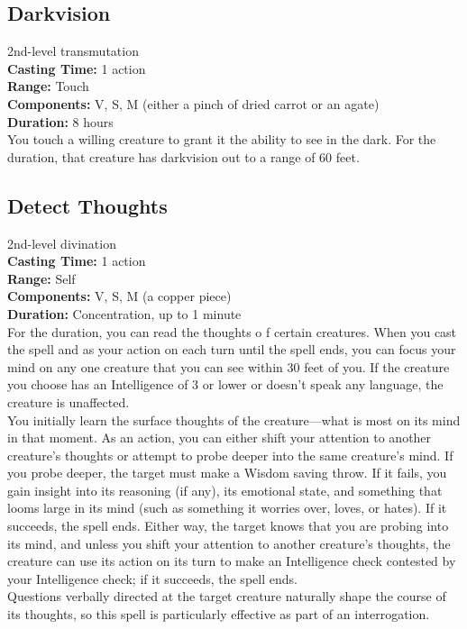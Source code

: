 \documentclass[11pt, A4paper, english]{article}
\begin{document}
		\subsection{Darkvision}
2nd-level transmutation \\
\textbf{Casting Time:} 1 action \\
\textbf{Range:} Touch \\
\textbf{Components:} V, S, M (either a pinch of dried carrot or an agate) \\
\textbf{Duration:} 8 hours \\
You touch a willing creature to grant it the ability to see in the dark. For the duration, that creature has darkvision out to a range of 60 feet.

		\subsection{Detect Thoughts}
2nd-level divination \\
\textbf{Casting Time:} 1 action \\
\textbf{Range:} Self \\
\textbf{Components:} V, S, M (a copper piece) \\
\textbf{Duration:} Concentration, up to 1 minute \\
For the duration, you can read the thoughts o f certain creatures. When you cast the spell and as your action on each turn until the spell ends, you can focus your mind on any one creature that you can see within 30 feet of you. If the creature you choose has an Intelligence of 3 or lower or doesn’t speak any language, the creature is unaffected. \\
You initially learn the surface thoughts of the creature—what is most on its mind in that moment. As an action, you can either shift your attention to another creature’s thoughts or attempt to probe deeper into the same creature’s mind. If you probe deeper, the target must make a Wisdom saving throw. If it fails, you gain insight into its reasoning (if any), its emotional state, and something that looms large in its mind (such as something it worries over, loves, or hates). If it succeeds, the spell ends. Either way, the target knows that you are probing into its mind, and unless you shift your attention to another creature’s thoughts, the creature can use its action on its turn to make an Intelligence check contested by your Intelligence check; if it succeeds, the spell ends. \\
Questions verbally directed at the target creature naturally shape the course of its thoughts, so this spell is particularly effective as part of an interrogation. \\
\end{document}

